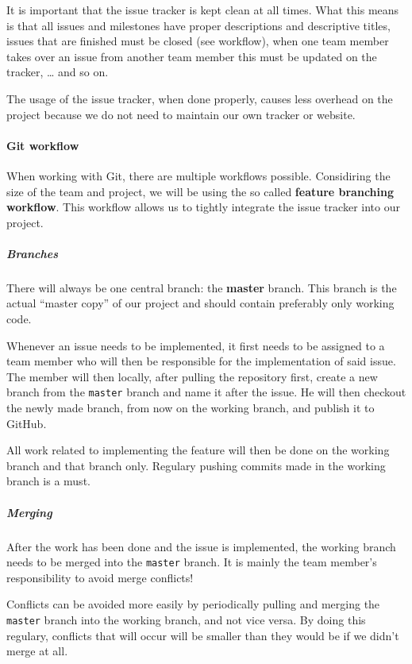 \documentclass[9pt]{article}
\begin{document}
It is important that the issue tracker is kept clean at all times. What
this means is that all issues and milestones have proper descriptions
and descriptive titles, issues that are finished must be closed (see
workflow), when one team member takes over an issue from another team
member this must be updated on the tracker, \ldots{} and so on.

The usage of the issue tracker, when done properly, causes less overhead
on the project because we do not need to maintain our own tracker or
website.

\paragraph{Git workflow}\label{git-workflow}

When working with Git, there are multiple workflows possible.
Considiring the size of the team and project, we will be using the so
called \textbf{feature branching workflow}. This workflow allows us to
tightly integrate the issue tracker into our project.

\subparagraph{Branches}\label{branches}

There will always be one central branch: the \textbf{master} branch.
This branch is the actual ``master copy'' of our project and should
contain preferably only working code.

Whenever an issue needs to be implemented, it first needs to be assigned
to a team member who will then be responsible for the implementation of
said issue. The member will then locally, after pulling the repository
first, create a new branch from the \texttt{master} branch and name it
after the issue. He will then checkout the newly made branch, from now
on the working branch, and publish it to GitHub.

All work related to implementing the feature will then be done on the
working branch and that branch only. Regulary pushing commits made in
the working branch is a must.

\subparagraph{Merging}\label{merging}

After the work has been done and the issue is implemented, the working
branch needs to be merged into the \texttt{master} branch. It is mainly
the team member's responsibility to avoid merge conflicts!

Conflicts can be avoided more easily by periodically pulling and merging
the \texttt{master} branch into the working branch, and not vice versa.
By doing this regulary, conflicts that will occur will be smaller than
they would be if we didn't merge at all.
\end{document}
